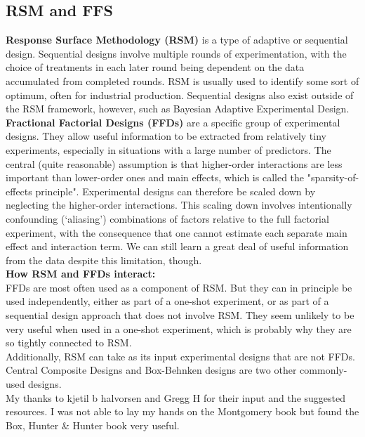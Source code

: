 \documentclass{article}
\begin{document}
\subsection{RSM and FFS}
\textbf{Response Surface Methodology (RSM)} is a type of adaptive or sequential design. Sequential designs involve multiple rounds of experimentation, with the choice of treatments in each later round being dependent on the data accumulated from completed rounds. RSM is usually used to identify some sort of optimum, often for industrial production. Sequential designs also exist outside of the RSM framework, however, such as Bayesian Adaptive Experimental Design.\\[8pt]
\textbf{Fractional Factorial Designs (FFDs)} are a specific group of experimental designs. They allow useful information to be extracted from relatively tiny experiments, especially in situations with a large number of predictors. The central (quite reasonable) assumption is that higher-order interactions are less important than lower-order ones and main effects, which is called the "sparsity-of-effects principle". Experimental designs can therefore be scaled down by neglecting the higher-order interactions. This scaling down involves intentionally confounding (‘aliasing’) combinations of factors relative to the full factorial experiment, with the consequence that one cannot estimate each separate main effect and interaction term. We can still learn a great deal of useful information from the data despite this limitation, though.\\[8pt]
\textbf{How RSM and FFDs interact:}\\[8pt]
FFDs are most often used as a component of RSM. But they can in principle be used independently, either as part of a one-shot experiment, or as part of a sequential design approach that does not involve RSM. They seem unlikely to be very useful when used in a one-shot experiment, which is probably why they are so tightly connected to RSM.\\[8pt]
Additionally, RSM can take as its input experimental designs that are not FFDs. Central Composite Designs and Box-Behnken designs are two other commonly-used designs.\\[8pt]
My thanks to kjetil b halvorsen and Gregg H for their input and the suggested resources. I was not able to lay my hands on the Montgomery book but found the Box, Hunter \& Hunter book very useful.

    
\end{document}
